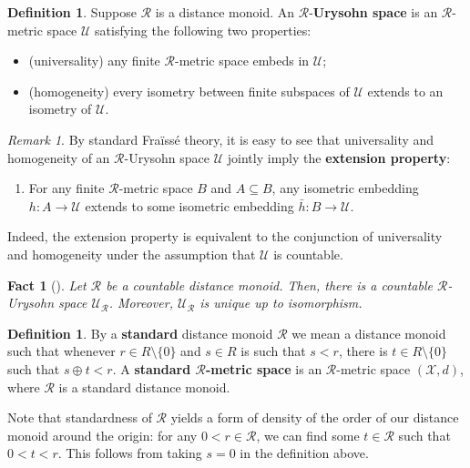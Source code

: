 \documentclass{article}
\newtheorem{fact}[theorem]{Fact}
\theoremstyle{remark}
\newtheorem{remark}[theorem]{Remark}
\theoremstyle{definition}
\newtheorem{definition}[theorem]{Definition}
\newcommand{\U}[0]{\mathbb{U}}
\renewcommand{\U}[0]{\mathcal{U}}
\newcommand{\rr}[0]{\mathcal{R}}
\begin{document}
{{{{{\begin{definition}
	\label{def-un}
Suppose $\rr$ is a distance monoid. An $\rr$-{\bf Urysohn space} is an $\rr$-metric space $\U$ satisfying the following two properties:
\begin{itemize}
	\item  (universality)\label{universality} any finite $\rr$-metric space embeds in $\U$; 
	\item (homogeneity) \label{ultrahomogeneity} every isometry between finite subspaces of $\U$ extends to an isometry of $\U$.
\end{itemize}

\end{definition}
\begin{remark}{By standard Fra\"{i}ss\'{e} theory, it is easy to see that universality and homogeneity of an $\rr$-Urysohn space $\U$ jointly imply the \textbf{extension property}:}
	\begin{enumerate}
		\item[(EP)] \label{extensionproperty} For any finite $\rr$-metric space $B$ and $A\subseteq B$, any isometric embedding
		$h:A\to\U$ extends to some isometric embedding $\bar{h}:B\to\U$. 
	\end{enumerate}
   {Indeed, the extension property is equivalent to the conjunction of universality and homogeneity under the assumption that $\U$ is countable.}
\end{remark}

\begin{fact}[{\cite[Theorem 2.7.7]{con15}}] \label{fact:existenceUri} Let $\rr$ be a countable distance monoid. Then, there is a countable $\rr$-Urysohn space $\U_{\rr}$. Moreover, $\U_{\rr}$ is unique up to isomorphism.
\end{fact}

\begin{definition} By a \textbf{standard} distance monoid $\rr$ we mean a distance monoid 
such that whenever $r\in R\setminus\{0\}$ and $s\in R$ is such that $s<r$, there is $t\in R\setminus\{0\}$ such that $s\oplus t<r$. A \textbf{standard $\rr$-metric space} is an $\rr$-metric space $(\mathcal{X}, d)$, where $\rr$ is a standard distance monoid.
\end{definition}

Note that standardness of $\rr$ yields a form of density of the order of our distance monoid around the origin: for any $0<r\in\rr$, we can find some $t\in\rr$ such that $0<t<r$. This follows from taking $s=0$ in the definition above.\\ 




}}}}}
\end{document}
